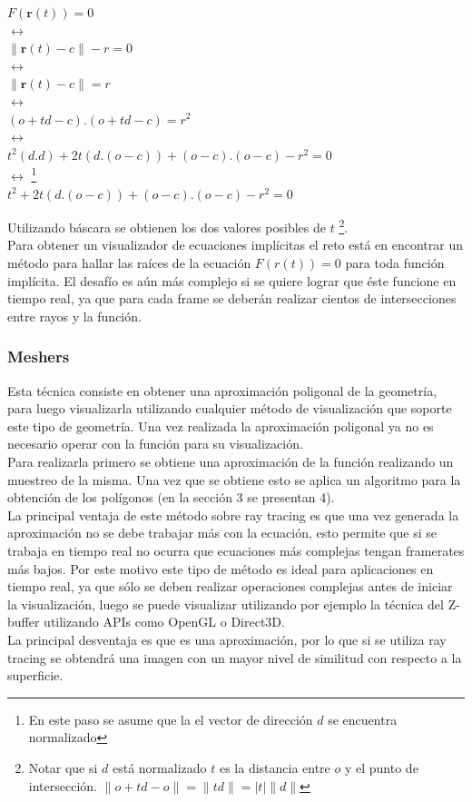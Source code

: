 \documentclass[12pt]{article}
\begin{document}
\begin{center}
$ F(\textbf{r}(t))= 0$
\\$ \leftrightarrow$
\\$ \lVert \textbf{r}(t) -c \rVert - r = 0$
\\$ \leftrightarrow$
\\$ \lVert \textbf{r}(t) -c \rVert = r$
\\ $\leftrightarrow$
\\ $(o+td -c).(o+td -c) = r^2 $ 
\\ $\leftrightarrow$
\\$t^2(d.d) + 2t(d.(o-c)) + (o-c).(o-c) - r^2=0$
\\ $\leftrightarrow$ \footnote{En este paso se asume que la el vector de dirección $d$ se encuentra normalizado}
\\$t^2 + 2t(d.(o-c)) + (o-c).(o-c) - r^2=0$
\end{center}
Utilizando báscara se obtienen los dos valores posibles de $t$ \footnote{Notar que si $d$ está normalizado $t$ es la distancia entre $o$ y el punto de intersección. $\lVert o + td - o \rVert = \lVert td\rVert = |t|\lVert d \rVert$}.
\\Para obtener un visualizador de ecuaciones implícitas el reto está en encontrar un método para hallar las raíces de la ecuación $F(r(t))=0$ para toda función implícita. El desafío es aún más complejo si se quiere lograr que éste funcione en tiempo real, ya que para cada frame se deberán realizar cientos de intersecciones entre rayos y la función.  
\subsubsection{Meshers}
Esta técnica consiste en obtener una aproximación poligonal de la geometría, para luego visualizarla utilizando cualquier método de visualización que soporte este tipo de geometría. Una vez realizada la aproximación poligonal ya no es necesario operar con la función para su visualización.
\\Para realizarla primero se obtiene una aproximación de la función realizando un muestreo de la misma. Una vez que se obtiene esto se aplica un algoritmo para la obtención de los polígonos (en la sección 3 se presentan 4).
\\La principal ventaja de este método sobre ray tracing es que una vez generada la aproximación no se debe trabajar más con la ecuación, esto permite que si se trabaja en tiempo real no ocurra que ecuaciones más complejas tengan framerates más bajos. Por este motivo este tipo de método es ideal para aplicaciones en tiempo real, ya que sólo se deben realizar operaciones complejas antes de iniciar la visualización, luego se puede visualizar utilizando por ejemplo la técnica del Z-buffer utilizando APIs como OpenGL o Direct3D.
\\La principal desventaja es que es una aproximación, por lo que si se utiliza ray tracing se obtendrá una imagen con un mayor nivel de similitud con respecto a la superficie.
\clearpage
\end{document}
